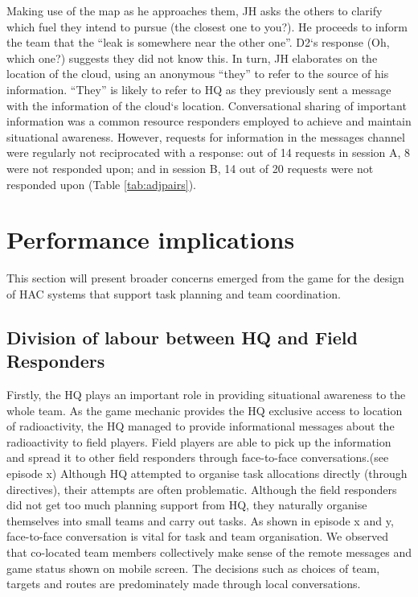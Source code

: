 Making use of the map as he approaches them, JH asks the others to clarify which fuel they intend to pursue (the closest one to you?). He proceeds to inform the team that the ``leak is somewhere near the other one''. D2`s response (Oh, which one?) suggests they did not know this. In turn, JH elaborates on the location of the cloud, using an anonymous ``they'' to refer to the source of his information. ``They'' is likely to refer to HQ as they previously sent a message with the information of the cloud`s location. Conversational sharing of important information was a common resource responders employed to achieve and maintain situational awareness. However, requests for information in the messages channel were regularly not reciprocated with a response: out of 14 requests in session A, 8 were not responded upon; and in session B, 14 out of 20 requests were not responded upon (Table \ref{tab:adjpairs}).\\

\section{Performance implications}
This section will present broader concerns emerged from the game for the design of HAC systems that support task planning and team coordination.\\

\subsection{Division of labour between HQ and Field Responders}
Firstly, the HQ plays an important role in providing situational awareness to the whole team. As the game mechanic provides the HQ exclusive access to location of radioactivity, the HQ managed to provide informational messages about the radioactivity to field players. Field players are able to pick up the information and spread it to other field responders through face-to-face conversations.(see episode x) Although HQ attempted to organise task allocations directly (through directives), their attempts are often problematic.  Although the field responders did not get too much planning support from HQ, they naturally organise themselves into small teams and carry out tasks. As shown in episode x and y,  face-to-face conversation is vital for task and team organisation. We observed that co-located team members collectively make sense of the remote messages and game status shown on mobile screen. The decisions such as choices of team, targets and routes are  predominately made through local conversations.\\

